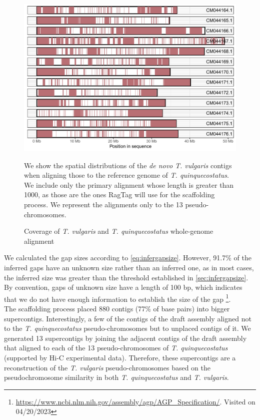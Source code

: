 \begin{figure}
    \centering
    \includegraphics[width=\textwidth]{gfx/coverage_long_reads_tq.pdf}
    \caption{Coverage of \textit{T. vulgaris} and \textit{T. quinquecostatus} whole-genome alignment}
    \small
    We show the spatial distributions of the \textit{de novo} \textit{T. vulgaris} contigs when aligning those to the reference genome of   \textit{T. quinquecostatus}. We include only the primary alignment whose length is greater than 1000, as those are the ones RagTag will use for the scaffolding process. We represent the alignments only to the 13 pseudo-chromosomes.  
    \label{fig:coverage_long_reads}
\end{figure}   

We calculated the gap sizes according to \eqref{eq:infergapsize}. However, 91.7\% of the inferred gaps have an unknown size rather than an inferred one, as in most cases, the inferred size was greater than the threshold established in \autoref{sec:infergapsize}. By convention, gaps of unknown size have a  length of 100 bp, which indicates that we do not have enough information to establish the size of the gap \footnote{\url{https://www.ncbi.nlm.nih.gov/assembly/agp/AGP_Specification/}. Visited on 04/20/2023}.\\

The scaffolding process placed 880 contigs (77\% of base pairs) into bigger supercontigs.  Interestingly, a few of the contigs of the draft assembly aligned not to the \textit{T. quinquecostatus} pseudo-chromosomes but to unplaced contigs of it. We generated 13 supercontigs by joining the adjacent contigs of the draft assembly that aligned to each of the 13 pseudo-chromosomes of \textit{T. quinquecostatus} (supported by \ac{Hi-C} experimental data). Therefore,  these supercontigs are a reconstruction of the \textit{T. vulgaris} pseudo-chromosomes based on the pseudochromosome similarity in both \textit{T. quinquecostatus} and \textit{T. vulgaris}.\\

